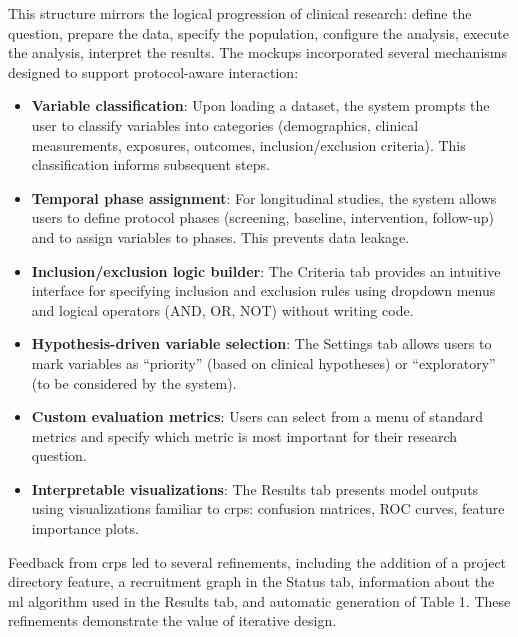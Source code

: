 This structure mirrors the logical progression of clinical research: define the question, prepare the data, specify the population, configure the analysis, execute the analysis, interpret the results. The mockups incorporated several mechanisms designed to support protocol-aware interaction:  
  
\begin{itemize}  
    \item \textbf{Variable classification}: Upon loading a dataset, the system prompts the user to classify variables into categories (demographics, clinical measurements, exposures, outcomes, inclusion/exclusion criteria). This classification informs subsequent steps.  
      
    \item \textbf{Temporal phase assignment}: For longitudinal studies, the system allows users to define protocol phases (screening, baseline, intervention, follow-up) and to assign variables to phases. This prevents data leakage.  
      
    \item \textbf{Inclusion/exclusion logic builder}: The Criteria tab provides an intuitive interface for specifying inclusion and exclusion rules using dropdown menus and logical operators (AND, OR, NOT) without writing code.  
      
    \item \textbf{Hypothesis-driven variable selection}: The Settings tab allows users to mark variables as ``priority'' (based on clinical hypotheses) or ``exploratory'' (to be considered by the system).  
      
    \item \textbf{Custom evaluation metrics}: Users can select from a menu of standard metrics and specify which metric is most important for their research question.  
      
    \item \textbf{Interpretable visualizations}: The Results tab presents model outputs using visualizations familiar to \glspl{crp}: confusion matrices, ROC curves, feature importance plots.  
\end{itemize}  
  
Feedback from \glspl{crp} led to several refinements, including the addition of a project directory feature, a recruitment graph in the Status tab, information about the \gls{ml} algorithm used in the Results tab, and automatic generation of Table 1. These refinements demonstrate the value of iterative design.